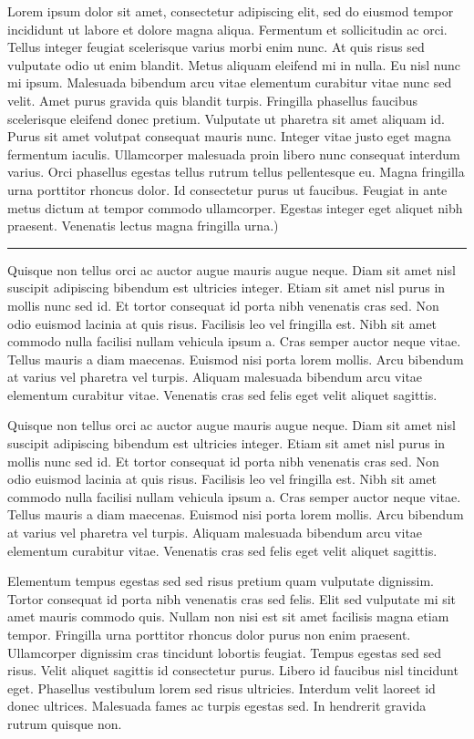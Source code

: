 \documentclass[10pt]{article}
\newenvironment{BoxedInternal}[1][]
{%
  \begin{changemargin}{0cm}{0cm}%
    \begin{mdframed}[roundcorner=5pt,backgroundcolor=swred,outermargin  =-0.5in,innermargin =-0.5in, topline=false, bottomline=false, rightline=false, leftline=false,#1]
    }{%
    \end{mdframed}%
  \end{changemargin}%
}
\newcommand*{\noind}{\setlength{\parindent}{0cm}} %
\newcommand{\bighdr}[2][]{%
\vspace{2pt}
  \begin{BoxedInternal}[#1]{}
    \color{white}\huge\bfseries\headingfont\filcenter{#2}
  \end{BoxedInternal}\vspace{-8pt}%
}
\newcommand{\medhdr}[1][]{%
	{\noind{\Large\bfseries\headingfont{#1}}}
	\vspace{-9pt}

	\noindent\rule{2.75in}{2pt} %
}
\newcommand{\smlhdr}[1][]{%
	{\noind{\large\bfseries\headingfont{#1}}}
}
\begin{document}
\begin{multicols}{2}
Lorem ipsum dolor sit amet, consectetur adipiscing elit, sed do eiusmod tempor incididunt ut labore et dolore magna aliqua. Fermentum et sollicitudin ac orci. Tellus integer feugiat scelerisque varius morbi enim nunc. At quis risus sed vulputate odio ut enim blandit. Metus aliquam eleifend mi in nulla. Eu nisl nunc mi ipsum. Malesuada bibendum arcu vitae elementum curabitur vitae nunc sed velit. Amet purus gravida quis blandit turpis. Fringilla phasellus faucibus scelerisque eleifend donec pretium. Vulputate ut pharetra sit amet aliquam id. Purus sit amet volutpat consequat mauris nunc. Integer vitae justo eget magna fermentum iaculis. Ullamcorper malesuada proin libero nunc consequat interdum varius. Orci phasellus egestas tellus rutrum tellus pellentesque eu. Magna fringilla urna porttitor rhoncus dolor. Id consectetur purus ut faucibus. Feugiat in ante metus dictum at tempor commodo ullamcorper. Egestas integer eget aliquet nibh praesent. Venenatis lectus magna fringilla urna.)\\

\medhdr[SMALL SECTION]
{\noind
Quisque non tellus orci ac auctor augue mauris augue neque. Diam sit amet nisl suscipit adipiscing bibendum est ultricies integer. Etiam sit amet nisl purus in mollis nunc sed id. Et tortor consequat id porta nibh venenatis cras sed. Non odio euismod lacinia at quis risus. Facilisis leo vel fringilla est. Nibh sit amet commodo nulla facilisi nullam vehicula ipsum a. Cras semper auctor neque vitae. Tellus mauris a diam maecenas. Euismod nisi porta lorem mollis. Arcu bibendum at varius vel pharetra vel turpis. Aliquam malesuada bibendum arcu vitae elementum curabitur vitae. Venenatis cras sed felis eget velit aliquet sagittis.\\
}


\smlhdr[SMALLER SECTION]

{\noind
Quisque non tellus orci ac auctor augue mauris augue neque. Diam sit amet nisl suscipit adipiscing bibendum est ultricies integer. Etiam sit amet nisl purus in mollis nunc sed id. Et tortor consequat id porta nibh venenatis cras sed. Non odio euismod lacinia at quis risus. Facilisis leo vel fringilla est. Nibh sit amet commodo nulla facilisi nullam vehicula ipsum a. Cras semper auctor neque vitae. Tellus mauris a diam maecenas. Euismod nisi porta lorem mollis. Arcu bibendum at varius vel pharetra vel turpis. Aliquam malesuada bibendum arcu vitae elementum curabitur vitae. Venenatis cras sed felis eget velit aliquet sagittis.
}

\bighdr{COOL STUFF}
{\noind
Elementum tempus egestas sed sed risus pretium quam vulputate dignissim. Tortor consequat id porta nibh venenatis cras sed felis. Elit sed vulputate mi sit amet mauris commodo quis. Nullam non nisi est sit amet facilisis magna etiam tempor. Fringilla urna porttitor rhoncus dolor purus non enim praesent. Ullamcorper dignissim cras tincidunt lobortis feugiat. Tempus egestas sed sed risus. Velit aliquet sagittis id consectetur purus. Libero id faucibus nisl tincidunt eget. Phasellus vestibulum lorem sed risus ultricies. Interdum velit laoreet id donec ultrices. Malesuada fames ac turpis egestas sed. In hendrerit gravida rutrum quisque non.
}


\end{multicols}
\end{document}

